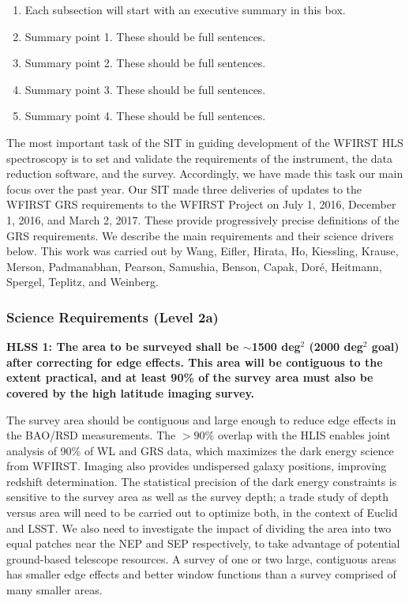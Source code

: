  \begin{summaryii}
 \begin{enumerate}
 \item Each subsection will start with an executive summary in this box.
 \item Summary point 1. These should be full sentences.
 \item Summary point 2. These should be full sentences.
 \item Summary point 3. These should be full sentences.
 \item Summary point 4. These should be full sentences.
 \end{enumerate}
 \end{summaryii}


 The most important task of the SIT in guiding development of the WFIRST HLS
 spectroscopy is to set and validate the requirements of the instrument, the data
 reduction software, and the survey.  Accordingly, we have made this task our main focus
 over the past year. Our SIT made three deliveries of updates to
 the WFIRST GRS requirements to the WFIRST Project on July 1, 2016, December 1,
 2016, and March 2, 2017. These provide progressively precise definitions of the
 GRS requirements. We describe the main requirements and their science drivers
 below. This work was carried out by Wang, Eifler, Hirata, Ho, Kiessling, Krause, Merson, Padmanabhan, Pearson, Samushia,
 Benson, Capak, Dor\'e, Heitmann, Spergel, Teplitz, and Weinberg.

 \subsubsection{Science Requirements (Level 2a)}

 \noindent
 {\bf HLSS 1: The area to be surveyed shall be $\sim$1500 deg$^2$ (2000 deg$^2$ goal) after
 correcting for edge effects.  This area will be contiguous to the extent
 practical, and at least 90\% of the survey area must also be covered by the high
 latitude imaging survey. }

 The survey area should be contiguous and large enough to reduce edge effects in
 the BAO/RSD measurements.  The $>90\%$ overlap with the HLIS enables joint
 analysis of 90\% of WL and GRS data, which maximizes the dark energy science
 from WFIRST.  Imaging also provides undispersed galaxy positions, improving
 redshift determination.  The statistical precision of the dark energy
 constraints is sensitive to the survey area as well as the survey depth; a trade
 study of depth versus area will need to be carried out to optimize both, in the
 context of Euclid and LSST. We also need to investigate the impact of dividing
 the area into two equal patches near the NEP and SEP respectively, to take
 advantage of potential ground-based telescope resources.  A survey of one or
 two large, contiguous areas has smaller edge effects and better window functions
 than a survey comprised of many smaller areas.

